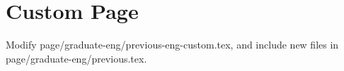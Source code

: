 \chapter*{Custom Page}
\thispagestyle{previous}

Modify page/graduate-eng/previous-eng-custom.tex, and include new files in
page/graduate-eng/previous.tex.